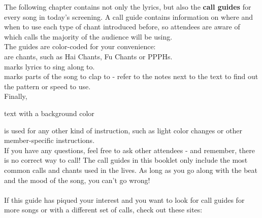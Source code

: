 \ifdefined\COMPLETE
\else
	
	
\fi

\def\pagetitletext{Call Guides}

The following chapter contains not only the lyrics, but also the \textbf{call guides} for every song in today's screening. A call guide contains information on where and when to use each type of chant introduced before, so attendees are aware of which calls the majority of the audience will be using.\\

The guides are color-coded for your convenience:\\
 are chants, such as Hai Chants, Fu Chants or PPPHs.\\
 marks lyrics to sing along to.\\
 marks parts of the song to clap to - refer to the notes next to the text to find out the pattern or speed to use.\\
Finally, {\setlength{\fboxsep}{0pt}\colorbox{chika!30}{\strut{text with a background color}}} is used for any other kind of instruction, such as light color changes or other member-specific instructions.\\

If you have any questions, feel free to ask other attendees - and remember, there is no correct way to call! The call guides in this booklet only include the most common calls and chants used in the lives. As long as you go along with the beat and the mood of the song, you can't go wrong!\\
\vspace{\fill}\\
If this guide has piqued your interest and you want to look for call guides for more songs or with a different set of calls, check out these sites:\\

